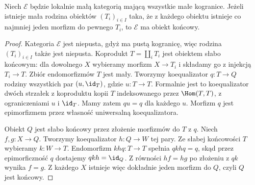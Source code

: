 \begin{lemat}\label{cat:lem:accessible-weak-terminal}
Niech $\mathcal E$ będzie lokalnie małą kategorią mającą wszystkie małe kogranice. Jeżeli istnieje mała rodzina obiektów $(T_i)_{i\in I}$ taka, że z każdego obiektu istnieje co najmniej jeden morfizm do pewnego $T_i$, to $\mathcal E$ ma obiekt końcowy.
\end{lemat}
\begin{proof}
Kategoria $\mathcal E$ jest niepusta, gdyż ma pustą kogranicę, więc rodzina $(T_i)_{i\in I}$ także jest niepusta. Koprodukt $T=\coprod_i T_i$ jest obiektem słabo końcowym: dla dowolnego $X$ wybieramy morfizm $X\to T_i$ i składamy go z injekcją $T_i\to T$. Zbiór endomorfizmów $T$ jest mały. Tworzymy koequalizator $q:T\to Q$ rodziny wszystkich par $(u,\id_T)$, gdzie $u:T\to T$. Formalnie jest to koequalizator dwóch strzałek z koproduktu kopii $T$ indeksowanego przez $\Hom(T,T)$, z ograniczeniami $u$ i $\id_T$. Mamy zatem $qu=q$ dla każdego $u$. Morfizm $q$ jest epimorfizmem przez własność uniwersalną koequalizatora.

Obiekt $Q$ jest słabo końcowy przez złożenie morfizmów do $T$ z $q$. Niech $f,g:X\to Q$. Tworzymy koequalizator $h:Q\to W$ tej pary. Ze słabej końcowości $T$ wybieramy $k:W\to T$. Endomorfizm $khq:T\to T$ spełnia $qkhq=q$, skąd przez epimorficzność $q$ dostajemy $qkh=\id_Q$. Z równości $hf=hg$ po złożeniu z $qk$ wynika $f=g$. Z każdego $X$ istnieje więc dokładnie jeden morfizm do $Q$, czyli $Q$ jest końcowy.
\end{proof}

